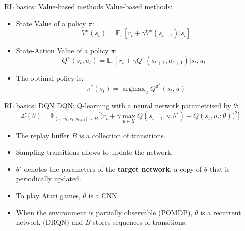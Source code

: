 \documentclass{beamer}
\DeclareMathOperator*{\argmax}{argmax} %
\begin{document}
\begin{frame}{RL basics: Value-based methods}
Value-based methods:
\vfill
    \begin{itemize}
    \item State Value of a policy $\pi$:
    \begin{equation*}
    V^\pi(s_t) = \mathbb{E}_\pi \left[r_t + \gamma V^\pi(s_{t+1}) | s_t\right]
    \end{equation*}
    \vfill
    \item State-Action Value of a policy $\pi$:
    \begin{equation*}
    Q^\pi(s_t, u_t)  = \mathbb{E}_\pi \left[r_t + \gamma  Q^\pi(s_{t+1}, u_{t+1}) | s_t, u_t \right]
    \end{equation*}
    \vfill
    \item The optimal policy is:
    \begin{equation*}
    \pi^*(s_t) = \argmax_u Q^{\pi^*}(s_{t}, u)
    \end{equation*}
\end{itemize}{}
\end{frame}

\begin{frame}{RL basics: DQN}
DQN: Q-learning with a neural network parametrised by $\theta$:
\begin{equation*}
    \mathcal{L}(\theta) = \mathds{E}_{\langle s_{t},u_{t},r_{t},s_{t+1}\rangle \sim B} 
    \bigg[  
    \big(r_{t} + \gamma \max_{u \in \mathcal{U}} Q(s_{t+1}, u; \theta')
    - Q(s_{t}, u_{t}; \theta)\big)^{2}\bigg]
    \label{eq:DQN_loss}
\end{equation*}
\vfill
\begin{itemize}
    
    \item The replay buffer $B$ is a collection of transitions.
    \item Sampling transitions allows to update the network.
    \item $\theta'$ denotes the parameters of the \textbf{target network}, a copy of $\theta$ that is periodically updated.
    \vfill
    \item To play Atari games, $\theta$ is a CNN.
    \item When the environment is partially observable (POMDP), $\theta$ is a recurrent network (DRQN) and $B$ stores sequences of transitions.
    
    
\end{itemize}{}
\end{frame}
\end{document}
